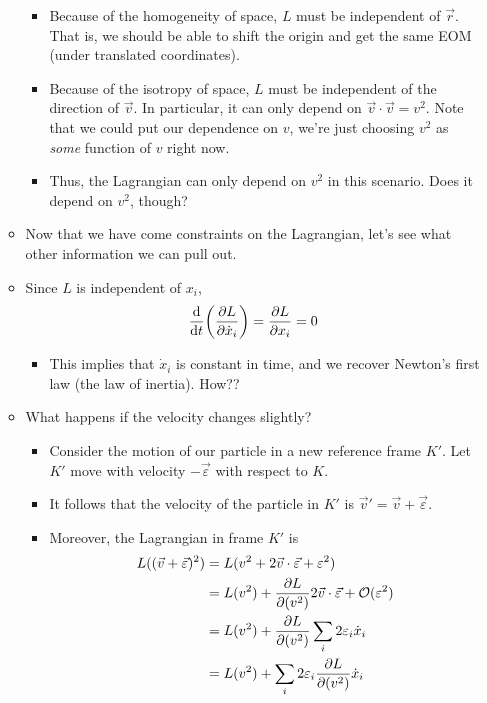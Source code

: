 \documentclass[../notes.tex]{subfiles}
\begin{document}
\begin{itemize}
\begin{itemize}
\begin{itemize}
            \item Because of the homogeneity of space, $L$ must be independent of $\vec{r}$. That is, we should be able to shift the origin and get the same EOM (under translated coordinates).
            \item Because of the isotropy of space, $L$ must be independent of the direction of $\vec{v}$. In particular, it can only depend on $\vec{v}\cdot\vec{v}=v^2$. Note that we could put our dependence on $v$, we're just choosing $v^2$ as \emph{some} function of $v$ right now.
            \item Thus, the Lagrangian can only depend on $v^2$ in this scenario. Does it depend on $v^2$, though?
        \end{itemize}
        \item Now that we have come constraints on the Lagrangian, let's see what other information we can pull out.
        \item Since $L$ is independent of $x_i$,
        \begin{equation*}
            \dv{t}(\pdv{L}{\dot{x}_i}) = \pdv{L}{x_i} = 0
        \end{equation*}
        \begin{itemize}
            \item This implies that $\dot{x}_i$ is constant in time, and we recover Newton's first law (the law of inertia). How??
        \end{itemize}
        \item What happens if the velocity changes slightly?
        \begin{itemize}
            \item Consider the motion of our particle in a new reference frame $K'$. Let $K'$ move with velocity $-\vec{\varepsilon}$ with respect to $K$.
            \item It follows that the velocity of the particle in $K'$ is $\vec{v}'=\vec{v}+\vec{\varepsilon}$.
            \item Moreover, the Lagrangian in frame $K'$ is
            \begin{align*}
                L((\vec{v}+\vec{\varepsilon})^2) &= L(v^2+2\vec{v}\cdot\vec{\varepsilon}+\varepsilon^2)\\
                &= L(v^2)+\pdv{L}{(v^2)}2\vec{v}\cdot\vec{\varepsilon}+\mathcal{O}(\varepsilon^2)\\
                &= L(v^2)+\pdv{L}{(v^2)}\sum_i2\varepsilon_i\dot{x}_i\\
                &= L(v^2)+\sum_i2\varepsilon_i\pdv{L}{(v^2)}\dot{x}_i

\end{align*}
\end{itemize}
\end{itemize}
\end{itemize}
\end{document}

